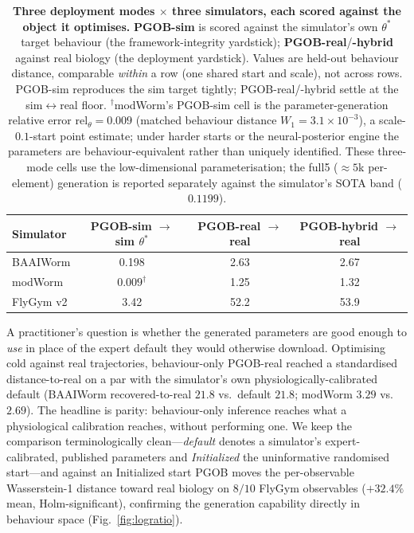 \documentclass[11pt]{article}
\begin{document}
\begin{table}[h]
\centering\small
\caption{\textbf{Three deployment modes $\times$ three simulators, each scored against the object it optimises.} \textbf{PGOB-sim} is scored against the simulator's own $\theta^{*}$ target behaviour (the framework-integrity yardstick); \textbf{PGOB-real}/\textbf{-hybrid} against real biology (the deployment yardstick). Values are held-out behaviour distance, comparable \emph{within} a row (one shared start and scale), not across rows. PGOB-sim reproduces the sim target tightly; PGOB-real/-hybrid settle at the sim$\leftrightarrow$real floor. $^{\dagger}$modWorm's PGOB-sim cell is the parameter-generation relative error $\mathrm{rel}_\theta{=}0.009$ (matched behaviour distance $W_1{=}3.1\times10^{-3}$), a scale-$0.1$-start point estimate; under harder starts or the neural-posterior engine the parameters are behaviour-equivalent rather than uniquely identified. These three-mode cells use the low-dimensional parameterisation; the full5 ($\approx5$k per-element) generation is reported separately against the simulator's SOTA band ($0.1199$).}
\label{tab:modes_v8}
\begin{tabular}{lccc}\toprule
Simulator & PGOB-sim $\to$ sim $\theta^{*}$ & PGOB-real $\to$ real & PGOB-hybrid $\to$ real \\\midrule
BAAIWorm   & 0.198 & 2.63 & 2.67 \\
modWorm    & $0.009^{\dagger}$ & 1.25 & 1.32 \\
FlyGym v2  & 3.42  & 52.2 & 53.9 \\\bottomrule
\end{tabular}
\end{table}

A practitioner's question is whether the generated parameters are good enough to \emph{use} in place of the expert default they would otherwise download. Optimising cold against real trajectories, behaviour-only PGOB-real reached a standardised distance-to-real on a par with the simulator's own physiologically-calibrated default (BAAIWorm recovered-to-real $21.8$ vs.\ default $21.8$; modWorm $3.29$ vs.\ $2.69$). The headline is parity: behaviour-only inference reaches what a physiological calibration reaches, without performing one. We keep the comparison terminologically clean---\emph{default} denotes a simulator's expert-calibrated, published parameters and \emph{Initialized} the uninformative randomised start---and against an Initialized start PGOB moves the per-observable Wasserstein-1 distance toward real biology on $8/10$ FlyGym observables ($+32.4\%$ mean, Holm-significant), confirming the generation capability directly in behaviour space (Fig.~\ref{fig:logratio}).
\end{document}

